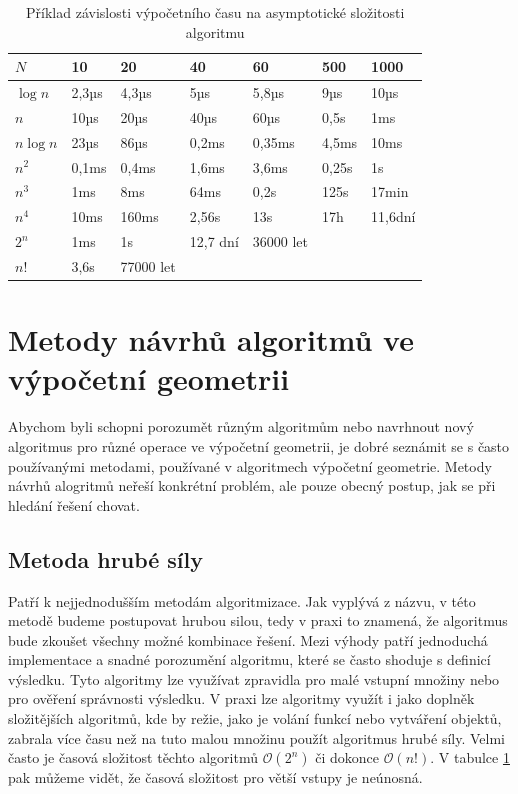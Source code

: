 	
\begin{table}

\begin{tabular}{ |p{1.4cm}||p{1.6cm}|p{1.6cm}|p{1.6cm}|p{1.6cm}|p{1.6cm}|p{1.6cm}|  }
\hline

$N$				&10			&20			&40			&60			&500		&1000\\
\hline
$\log n$		&2,3µs		&4,3µs		&5µs		&5,8µs		&9µs		&10µs\\			
$n$				&10µs		&20µs		&40µs		&60µs		&0,5s		&1ms\\
$n \log n$		&23µs		&86µs		&0,2ms		&0,35ms		&4,5ms		&10ms\\
$n^2$			&0,1ms		&0,4ms		&1,6ms		&3,6ms		&0,25s		&1s\\
$n^3$			&1ms		&8ms		&64ms		&0,2s		&125s		&17min\\
$n^4$			&10ms		&160ms		&2,56s		&13s		&17h		&11,6dní\\
$2^n$			&1ms		&1s			&12,7 dní	&36000 let	&			&\\
$n!$			&3,6s		&77000 let	&			&			&			&\\
\hline

\end{tabular}
\caption{Příklad závislosti výpočetního času na asymptotické složitosti algoritmu}
\label{tab:4-time_complexity}
\end{table}

\section{Metody návrhů algoritmů ve výpočetní geometrii}
	Abychom byli schopni porozumět různým algoritmům nebo navrhnout nový algoritmus pro různé operace ve výpočetní geometrii, je dobré seznámit se s často používanými metodami, používané v algoritmech výpočetní geometrie. Metody návrhů alogritmů neřeší konkrétní problém, ale pouze obecný postup, jak se při hledání řešení chovat.

\subsection{Metoda hrubé síly}
	Patří k nejjednodušším metodám algoritmizace. Jak vyplývá z názvu, v této metodě budeme postupovat hrubou silou, tedy v praxi to znamená, že algoritmus bude zkou\-šet všechny možné kombinace řešení. Mezi výhody patří jednoduchá implementace a snadné porozumění algoritmu, které se často shoduje s definicí výsledku. Tyto algoritmy lze využívat zpravidla pro malé vstupní množiny nebo pro ověření správnosti výsledku. V praxi lze algoritmy využít i jako doplněk složitějších algoritmů, kde by režie, jako je volání funkcí nebo vytváření objektů, zabrala více času než na tuto malou množinu použít algoritmus hrubé síly. Velmi často je časová složitost těchto algoritmů $\mathcal{O}(2^n)$ či dokonce $\mathcal{O}(n!)$. V tabulce \ref{tab:4-time_complexity} pak můžeme vidět, že časová složitost pro větší vstupy je neúnosná.
	
